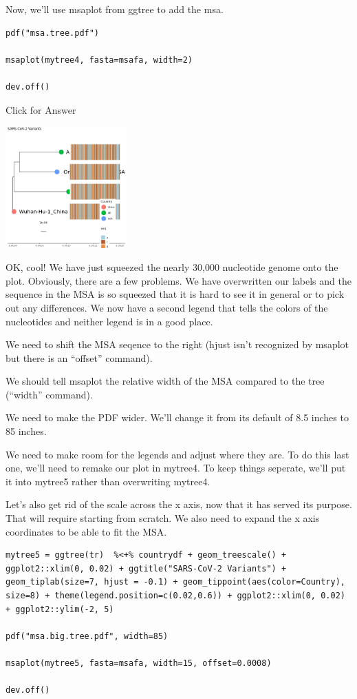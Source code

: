 \documentclass[
]{book}
\begin{document}
Now, we'll use msaplot from ggtree to add the msa.

\begin{verbatim}
pdf("msa.tree.pdf")

msaplot(mytree4, fasta=msafa, width=2)

dev.off()
\end{verbatim}

Click for Answer

\includegraphics[width=0.35\textwidth,height=\textheight]{./Figures/msa.tree.png}

\hfill\break

OK, cool! We have just squeezed the nearly 30,000 nucleotide genome onto the plot. Obviously, there are a few problems. We have overwritten our labels and the sequence in the MSA is so squeezed that it is hard to see it in general or to pick out any differences. We now have a second legend that tells the colors of the nucleotides and neither legend is in a good place.

We need to shift the MSA seqence to the right (hjust isn't recognized by msaplot but there is an ``offset'' command).

We should tell msaplot the relative width of the MSA compared to the tree (``width'' command).

We need to make the PDF wider. We'll change it from its default of 8.5 inches to 85 inches.

We need to make room for the legends and adjust where they are. To do this last one, we'll need to remake our plot in mytree4. To keep things seperate, we'll put it into mytree5 rather than overwriting mytree4.

Let's also get rid of the scale across the x axis, now that it has served its purpose. That will require starting from scratch. We also need to expand the x axis coordinates to be able to fit the MSA.

\begin{verbatim}
mytree5 = ggtree(tr)  %<+% countrydf + geom_treescale() + ggplot2::xlim(0, 0.02) + ggtitle("SARS-CoV-2 Variants") + geom_tiplab(size=7, hjust = -0.1) + geom_tippoint(aes(color=Country), size=8) + theme(legend.position=c(0.02,0.6)) + ggplot2::xlim(0, 0.02) + ggplot2::ylim(-2, 5)

pdf("msa.big.tree.pdf", width=85)

msaplot(mytree5, fasta=msafa, width=15, offset=0.0008)

dev.off()
\end{verbatim}
\end{document}
